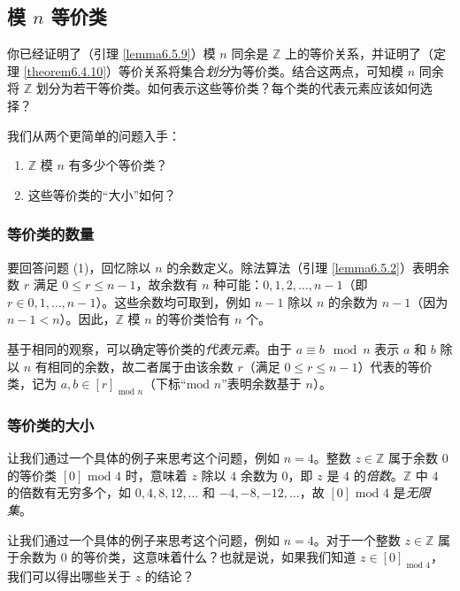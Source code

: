 
\subsection{模 $n$ 等价类}

你已经证明了（引理 \ref{lemma6.5.9}）模 $n$ 同余是 $\mathbb{Z}$ 上的等价关系，并证明了（定理 \ref{theorem6.4.10}）等价关系将集合\emph{划分}为等价类。结合这两点，可知模 $n$ 同余将 $\mathbb{Z}$ 划分为若干等价类。如何表示这些等价类？每个类的代表元素应该如何选择？

我们从两个更简单的问题入手：
\begin{enumerate}[label=(\arabic*)]
    \item $\mathbb{Z}$ 模 $n$ 有多少个等价类？
    \item 这些等价类的``大小''如何？
\end{enumerate}

\subsubsection*{等价类的数量}

要回答问题 (1)，回忆除以 $n$ 的余数定义。除法算法（引理 \ref{lemma6.5.2}）表明余数 $r$ 满足 $0 \le r \le n-1$，故余数有 $n$ 种可能：$0,1,2,\dots,n-1$（即 $r \in {0,1,\dots,n-1}$）。这些余数均可取到，例如 $n-1$ 除以 $n$ 的余数为 $n-1$（因为 $n-1 < n$）。因此，$\mathbb{Z}$ 模 $n$ 的等价类恰有 $n$ 个。

基于相同的观察，可以确定等价类的\emph{代表元素}。由于 $a \equiv b \mod n$ 表示 $a$ 和 $b$ 除以 $n$ 有相同的余数，故二者属于由该余数 $r$（满足 $0 \le r \le n-1$）代表的等价类，记为 $a, b \in [r]_{\text{\ mod\ } n}$（下标``$\text{mod\ } n$''表明余数基于 $n$）。

\subsubsection*{等价类的大小}

让我们通过一个具体的例子来思考这个问题，例如 $n = 4$。整数 $z \in \mathbb{Z}$ 属于余数 $0$ 的等价类 $[0]{\text{\ mod\ } 4}$ 时，意味着 $z$ 除以 $4$ 余数为 $0$，即 $z$ 是 $4$ 的\emph{倍数}。$\mathbb{Z}$ 中 $4$ 的倍数有无穷多个，如 $0,4,8,12,\dots$ 和 $-4,-8,-12,\dots$，故 $[0]{\text{\ mod\ } 4}$ 是\emph{无限集}。

让我们通过一个具体的例子来思考这个问题，例如 $n = 4$。对于一个整数 $z \in \mathbb{Z}$ 属于余数为 $0$ 的等价类，这意味着什么？也就是说，如果我们知道 $z \in [0]_{\text{\ mod\ } 4}$，我们可以得出哪些关于 $z$ 的结论？


